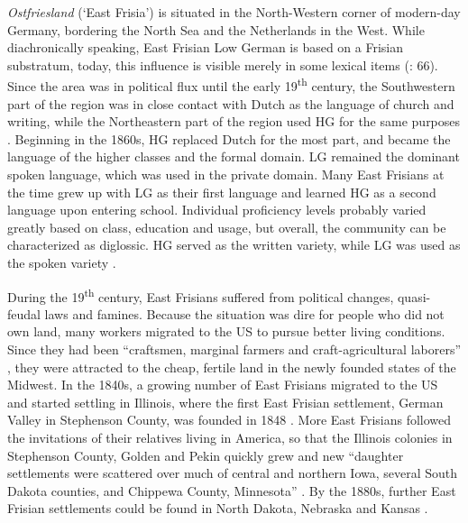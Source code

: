 \documentclass[output=paper]{langsci/langscibook}
\begin{document}
\textit{Ostfriesland} (‘East Frisia’) is situated in the North-Western corner of modern-day Germany, bordering the North Sea and the Netherlands in the West. While diachronically speaking, East Frisian Low German is based on a Frisian substratum, today, this influence is visible merely in some lexical items (\citealt{vanBree2017}: 66). Since the area was in political flux until the early 19\textsuperscript{th} century, the Southwestern part of the region was in close contact with Dutch as the language of church and writing, while the Northeastern part of the region used HG for the same purposes \citep[27]{Reershemius2004}. Beginning in the 1860s, HG replaced Dutch for the most part, and became the language of the higher classes and the formal domain. LG remained the dominant spoken language, which was used in the private domain. Many East Frisians at the time grew up with LG as their first language and learned HG as a second language upon entering school. Individual proficiency levels probably varied greatly based on class, education and usage, but overall, the community can be characterized as diglossic. HG served as the written variety, while LG was used as the spoken variety \citep{Reershemius2004}.

During the 19\textsuperscript{th} century, East Frisians suffered from political changes, quasi-feudal laws and famines. Because the situation was dire for people who did not own land, many workers migrated to the US to pursue better living conditions. Since they had been “craftsmen, marginal farmers and craft-agricultural laborers” \citep[163]{Frizzel1992}, they were attracted to the cheap, fertile land in the newly founded states of the Midwest. In the 1840s, a growing number of East Frisians migrated to the US and started settling in Illinois, where the first East Frisian settlement, German Valley in Stephenson County, was founded in 1848 \citep{Schnucker1917}. More East Frisians followed the invitations of their relatives living in America, so that the Illinois colonies in Stephenson County, Golden and Pekin quickly grew and new “daughter settlements were scattered over much of central and northern Iowa, several South Dakota counties, and Chippewa County, Minnesota” \citep[163]{Frizzel1992}. By the 1880s, further East Frisian settlements could be found in North Dakota, Nebraska and Kansas \citep[79]{Lindaman2004}. 
\end{document}
